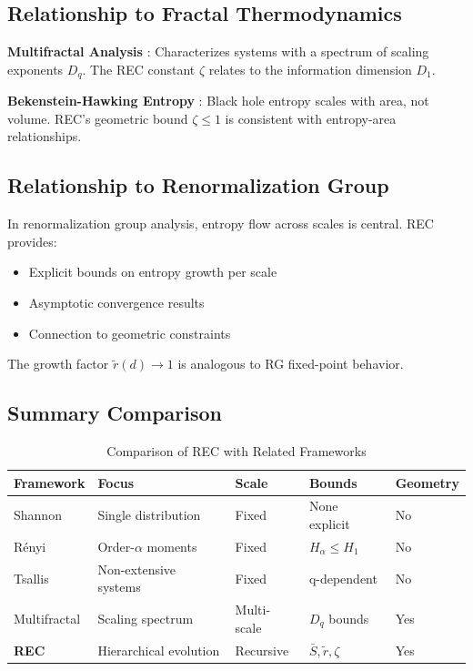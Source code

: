 \documentclass[11pt,a4paper]{article}
\theoremstyle{definition}
\theoremstyle{remark}
\newcommand{\Sbar}{\bar{S}}
\newcommand{\rtilde}{\tilde{r}}
\begin{document}
\subsection{Relationship to Fractal Thermodynamics}

\textbf{Multifractal Analysis} \cite{halsey1986}: Characterizes systems with a spectrum of scaling exponents $D_q$. The REC constant $\zeta$ relates to the information dimension $D_1$.

\textbf{Bekenstein-Hawking Entropy} \cite{bekenstein1973}: Black hole entropy scales with area, not volume. REC's geometric bound $\zeta \leq 1$ is consistent with entropy-area relationships.

\subsection{Relationship to Renormalization Group}

In renormalization group analysis, entropy flow across scales is central. REC provides:
\begin{itemize}[nosep]
    \item Explicit bounds on entropy growth per scale
    \item Asymptotic convergence results
    \item Connection to geometric constraints
\end{itemize}

The growth factor $\rtilde(d) \to 1$ is analogous to RG fixed-point behavior.

\subsection{Summary Comparison}

\begin{table}[H]
\centering
\caption{Comparison of REC with Related Frameworks}
\label{tab:comparison}
\begin{tabular}{@{}lllll@{}}
\toprule
\textbf{Framework} & \textbf{Focus} & \textbf{Scale} & \textbf{Bounds} & \textbf{Geometry} \\
\midrule
Shannon & Single distribution & Fixed & None explicit & No \\
R\'enyi & Order-$\alpha$ moments & Fixed & $H_\alpha \leq H_1$ & No \\
Tsallis & Non-extensive systems & Fixed & q-dependent & No \\
Multifractal & Scaling spectrum & Multi-scale & $D_q$ bounds & Yes \\
\textbf{REC} & Hierarchical evolution & Recursive & $\Sbar, \rtilde, \zeta$ & Yes \\
\bottomrule
\end{tabular}
\end{table}
\end{document}
